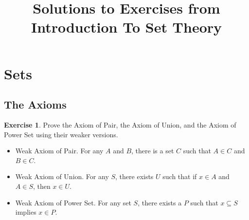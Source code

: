 \documentclass[a4paper,11pt]{article}
\theoremstyle{definition}
\newtheorem{exercise}{Exercise}[subsection]
\begin{document}
\title{Solutions to Exercises from Introduction To Set Theory}
\date{}
\maketitle

\tableofcontents
\newpage

\section{Sets}

\setcounter{subsection}{2}

\subsection{The Axioms}

\setcounter{exercise}{6}

\begin{exercise}
  Prove the Axiom of Pair, the Axiom of Union, and the Axiom of Power Set using
  their weaker versions.

  \begin{itemize}
  \item Weak Axiom of Pair. For any \(A\) and \(B\), there is a set \(C\) such
    that \(A \in C\) and \(B \in C\).
  \item Weak Axiom of Union. For any \(S\), there exists \(U\) such that if
    \(x \in A\) and \(A \in S\), then \(x \in U\).
  \item Weak Axiom of Power Set. For any set \(S\), there exists a \(P\) such
    that \(x \subseteq S\) implies \(x \in P\).
  \end{itemize}
\end{exercise}
\end{document}
